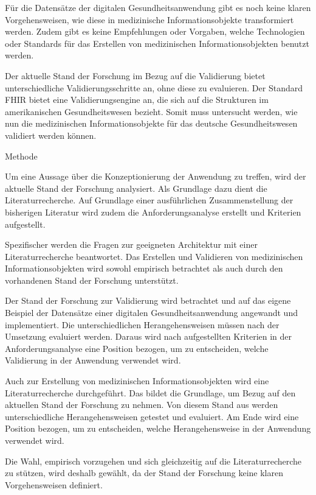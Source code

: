 Für die Datensätze der digitalen Gesundheitsanwendung gibt es noch keine klaren Vorgehensweisen, wie diese in medizinische Informationsobjekte transformiert werden. 
Zudem gibt es keine Empfehlungen oder Vorgaben, welche Technologien oder Standards für das Erstellen von medizinischen Informationsobjekten benutzt werden.

Der aktuelle Stand der Forschung im Bezug auf die Validierung bietet unterschiedliche Validierungsschritte an, ohne diese zu evaluieren. Der Standard FHIR bietet eine Validierungsengine an, die sich auf die Strukturen im amerikanischen Gesundheitswesen bezieht. Somit muss untersucht werden, wie nun die medizinischen Informationsobjekte für das deutsche Gesundheitswesen validiert werden können. 

Methode 

Um eine Aussage über die Konzeptionierung der Anwendung zu treffen, wird der aktuelle Stand der Forschung analysiert. Als Grundlage dazu dient die Literaturrecherche. Auf Grundlage einer ausführlichen Zusammenstellung der bisherigen Literatur wird zudem die Anforderungsanalyse erstellt und Kriterien aufgestellt. 

Spezifischer werden die Fragen zur geeigneten Architektur mit einer Literaturrecherche beantwortet. Das Erstellen und Validieren von medizinischen Informationsobjekten wird sowohl empirisch betrachtet als auch durch den vorhandenen Stand der Forschung unterstützt.

Der Stand der Forschung zur Validierung wird betrachtet und auf das eigene Beispiel der Datensätze einer digitalen Gesundheitsanwendung angewandt und implementiert. Die unterschiedlichen Herangehensweisen müssen nach der Umsetzung evaluiert werden. Daraus wird nach aufgestellten Kriterien in der Anforderungsanalyse eine Position bezogen, um zu entscheiden, welche Validierung in der Anwendung verwendet wird. 

Auch zur Erstellung von medizinischen Informationsobjekten wird eine Literaturrecherche durchgeführt. Das bildet die Grundlage, um Bezug auf den aktuellen Stand der Forschung zu nehmen. Von diesem Stand aus werden unterschiedliche Herangehensweisen getestet und evaluiert. Am Ende wird eine Position bezogen, um zu entscheiden, welche Herangehensweise in der Anwendung verwendet wird.

Die Wahl, empirisch vorzugehen und sich gleichzeitig auf die Literaturrecherche zu stützen, wird deshalb gewählt, da der Stand der Forschung keine klaren Vorgehensweisen definiert. 

